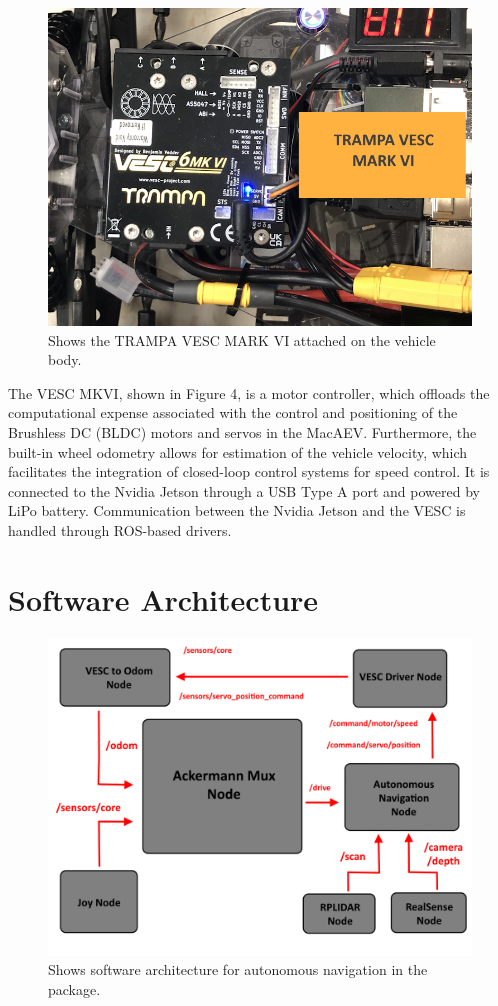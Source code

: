 \documentclass[conference]{IEEEtran}
\begin{document}
\begin{figure}
    \centering
    \includegraphics[scale=0.2]{motor_ctrl_diagram.png}
    \caption{Shows the TRAMPA VESC MARK VI attached on the vehicle body.}
    \label{Figure 4}
\end{figure}


The VESC MKVI, shown in Figure 4, is a motor controller, which offloads the computational expense associated with the control and positioning of the Brushless DC (BLDC) motors and servos in the MacAEV. Furthermore, the built-in wheel odometry allows for estimation of the vehicle velocity, which facilitates the integration of closed-loop control systems for speed control. It is connected to the Nvidia Jetson through a USB Type A port and powered by LiPo battery. Communication between the Nvidia Jetson and the VESC is handled through ROS-based drivers. 

\section{Software Architecture}

\begin{figure}[H]
    \centering
    \includegraphics[scale=0.25]{autonomous_architecture.png}
    \caption{Shows software architecture for autonomous navigation in the package.}
    \label{Figure 3}
\end{figure}
\end{document}
